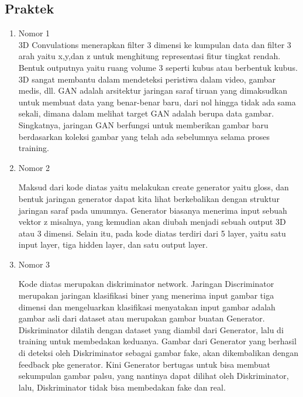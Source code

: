 \subsection{Praktek}
\begin{enumerate}
\item Nomor 1\\
3D Convulations menerapkan filter 3 dimensi ke kumpulan data dan filter 3 arah yaitu x,y,dan z untuk menghitung representasi fitur tingkat rendah. Bentuk outputnya yaitu ruang volume 3 seperti kubus atau berbentuk kubus. 3D sangat membantu dalam mendeteksi peristiwa dalam video, gambar medis, dll. GAN adalah arsitektur jaringan saraf tiruan yang dimaksudkan untuk membuat data yang benar-benar baru, dari nol hingga tidak ada sama sekali, dimana dalam melihat target GAN adalah berupa data gambar. Singkatnya, jaringan GAN berfungsi untuk memberikan gambar baru berdasarkan koleksi gambar yang telah ada sebelumnya selama proses training.

\item Nomor 2\\
\hfill\break
	
Maksud dari kode diatas yaitu melakukan create generator yaitu gloss, dan bentuk jaringan generator dapat kita lihat berkebalikan dengan struktur jaringan saraf pada umumnya. Generator biasanya menerima input sebuah vektor z misalnya, yang kemudian akan diubah menjadi sebuah output 3D atau 3 dimensi. Selain itu, pada kode diatas terdiri dari 5 layer, yaitu satu input layer, tiga hidden layer, dan satu output layer.

\item Nomor 3\\
\hfill\break
	
Kode diatas merupakan diskriminator network. Jaringan Discriminator merupakan jaringan klasifikasi biner yang menerima input gambar tiga dimensi dan mengeluarkan klasifikasi menyatakan input gambar adalah gambar asli dari dataset atau merupakan gambar buatan Generator. Diskriminator dilatih dengan dataset yang diambil dari Generator, lalu di training untuk membedakan keduanya. Gambar dari Generator yang berhasil di deteksi oleh Diskriminator sebagai gambar fake, akan dikembalikan dengan feedback pke generator. Kini Generator bertugas untuk bisa membuat sekumpulan gambar palsu, yang nantinya dapat dilihat oleh Diskriminator, lalu, Diskriminator tidak bisa membedakan fake dan real.


\end{enumerate}
